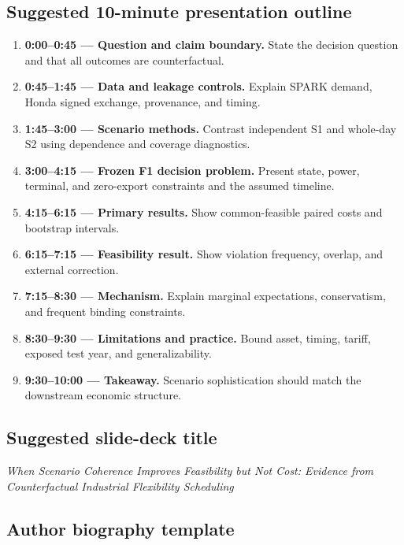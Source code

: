 \documentclass[10pt,twocolumn]{article}
\begin{document}
\subsection{Suggested 10-minute presentation outline}

\begin{enumerate}
  \item \textbf{0:00--0:45 --- Question and claim boundary.} State the decision
  question and that all outcomes are counterfactual.
  \item \textbf{0:45--1:45 --- Data and leakage controls.} Explain SPARK demand,
  Honda signed exchange, provenance, and timing.
  \item \textbf{1:45--3:00 --- Scenario methods.} Contrast independent S1 and
  whole-day S2 using dependence and coverage diagnostics.
  \item \textbf{3:00--4:15 --- Frozen F1 decision problem.} Present state,
  power, terminal, and zero-export constraints and the assumed timeline.
  \item \textbf{4:15--6:15 --- Primary results.} Show common-feasible paired
  costs and bootstrap intervals.
  \item \textbf{6:15--7:15 --- Feasibility result.} Show violation frequency,
  overlap, and external correction.
  \item \textbf{7:15--8:30 --- Mechanism.} Explain marginal expectations,
  conservatism, and frequent binding constraints.
  \item \textbf{8:30--9:30 --- Limitations and practice.} Bound asset, timing,
  tariff, exposed test year, and generalizability.
  \item \textbf{9:30--10:00 --- Takeaway.} Scenario sophistication should match
  the downstream economic structure.
\end{enumerate}

\subsection{Suggested slide-deck title}

\begin{center}
\emph{When Scenario Coherence Improves Feasibility but Not Cost: Evidence from
Counterfactual Industrial Flexibility Scheduling}
\end{center}

\subsection{Author biography template}
\end{document}
